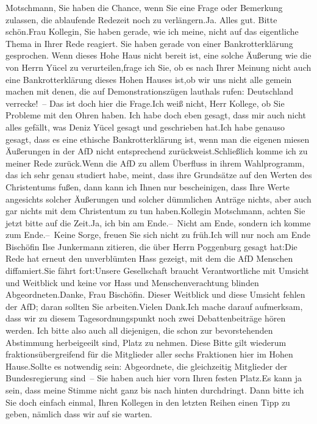 \documentclass{article}
\begin{document}
Motschmann, Sie haben die Chance, wenn Sie eine Frage oder Bemerkung zulassen, die ablaufende Redezeit noch zu verlängern.Ja. Alles gut. Bitte schön.Frau Kollegin, Sie haben gerade, wie ich meine, nicht auf das eigentliche Thema in Ihrer Rede reagiert. Sie haben gerade von einer Bankrotterklärung gesprochen. Wenn dieses Hohe Haus nicht bereit ist, eine solche Äußerung wie die von Herrn Yücel zu verurteilen,frage ich Sie, ob es nach Ihrer Meinung nicht auch eine Bankrotterklärung dieses Hohen Hauses ist,ob wir uns nicht alle gemein machen mit denen, die auf Demonstrationszügen lauthals rufen: Deutschland verrecke! – Das ist doch hier die Frage.Ich weiß nicht, Herr Kollege, ob Sie Probleme mit den Ohren haben. Ich habe doch eben gesagt, dass mir auch nicht alles gefällt, was Deniz Yücel gesagt und geschrieben hat.Ich habe genauso gesagt, dass es eine ethische Bankrotterklärung ist, wenn man die eigenen miesen Äußerungen in der AfD nicht entsprechend zurückweist.Schließlich komme ich zu meiner Rede zurück.Wenn die AfD zu allem Überfluss in ihrem Wahlprogramm, das ich sehr genau studiert habe, meint, dass ihre Grundsätze auf den Werten des Christentums fußen, dann kann ich Ihnen nur bescheinigen, dass Ihre Werte angesichts solcher Äußerungen und solcher dümmlichen Anträge nichts, aber auch gar nichts mit dem Christentum zu tun haben.Kollegin Motschmann, achten Sie jetzt bitte auf die Zeit.Ja, ich bin am Ende.– Nicht am Ende, sondern ich komme zum Ende.– Keine Sorge, freuen Sie sich nicht zu früh.Ich will nur noch am Ende Bischöfin Ilse Junkermann zitieren, die über Herrn Poggenburg gesagt hat:Die Rede hat erneut den unverblümten Hass gezeigt, mit dem die AfD Menschen diffamiert.Sie fährt fort:Unsere Gesellschaft braucht Verantwortliche mit Umsicht und Weitblick und keine vor Hass und Menschenverachtung blinden Abgeordneten.Danke, Frau Bischöfin. Dieser Weitblick und diese Umsicht fehlen der AfD; daran sollten Sie arbeiten.Vielen Dank.Ich mache darauf aufmerksam, dass wir zu diesem Tagesordnungspunkt noch zwei Debattenbeiträge hören werden. Ich bitte also auch all diejenigen, die schon zur bevorstehenden Abstimmung herbeigeeilt sind, Platz zu nehmen. Diese Bitte gilt wiederum fraktionsübergreifend für die Mitglieder aller sechs Fraktionen hier im Hohen Hause.Sollte es notwendig sein: Abgeordnete, die gleichzeitig Mitglieder der Bundesregierung sind – Sie haben auch hier vorn Ihren festen Platz.Es kann ja sein, dass meine Stimme nicht ganz bis nach hinten durchdringt. Dann bitte ich Sie doch einfach einmal, Ihren Kollegen in den letzten Reihen einen Tipp zu geben, nämlich dass wir auf sie warten.
\end{document}

